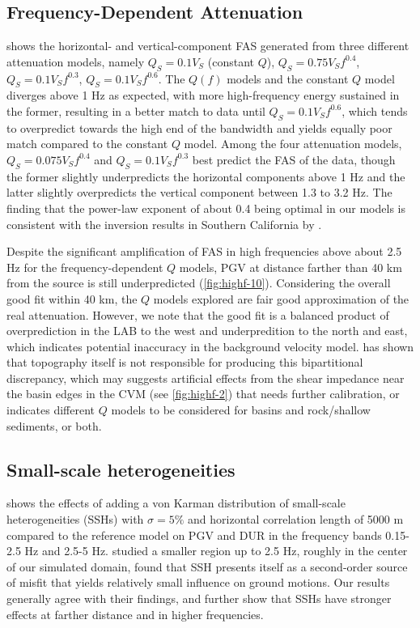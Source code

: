 \subsection{Frequency-Dependent Attenuation}\label{highf:qf}
 shows the horizontal- and vertical-component FAS generated from three different attenuation models, namely $Q_S=0.1V_S$ (constant $Q$), $Q_S=0.75V_Sf^{0.4}$, $Q_S=0.1V_Sf^{0.3}$, $Q_S=0.1V_Sf^{0.6}$. The $Q(f)$ models and the constant $Q$ model diverges above 1 Hz as expected, with more high-frequency energy sustained in the former, resulting in a better match to data until $Q_S=0.1V_Sf^{0.6}$, which tends to overpredict towards the high end of the bandwidth and yields equally poor match compared to the constant $Q$ model. Among the four attenuation models, $Q_S=0.075V_Sf^{0.4}$ and $Q_S=0.1V_Sf^{0.3}$ best predict the FAS of the data, though the former slightly underpredicts the horizontal components above 1 Hz and the latter slightly overpredicts the vertical component between 1.3 to 3.2 Hz. The finding that the power-law exponent of about 0.4 being optimal in our models is consistent with the inversion results in Southern California by \citet{linFrequencyDependentAttenuationWaves2018}.


Despite the significant amplification of FAS in high frequencies above about 2.5 Hz for the frequency-dependent $Q$ models, PGV at distance farther than 40 km from the source is still underpredicted (\cref{fig:highf-10}). Considering the overall good fit within 40 km, the $Q$ models explored are fair good approximation of the real attenuation. However, we note that the good fit is a balanced product of overprediction in the LAB to the west and underpredition to the north and east, which indicates potential inaccuracy in the background velocity model.  has shown that topography itself is not responsible for producing this bipartitional discrepancy, which may suggests artificial effects from the shear impedance near the basin edges in the CVM (see \cref{fig:highf-2}) that needs further calibration, or indicates different $Q$ models to be considered for basins and rock/shallow sediments, or both.

\subsection{Small-scale heterogeneities}
 shows the effects of adding a von Karman distribution of small-scale heterogeneities (SSHs) with $\sigma = 5\%$ and horizontal correlation length of 5000 m compared to the reference model on PGV and DUR in the frequency bands 0.15-2.5 Hz and 2.5-5 Hz. \citet{savranGroundMotionSimulation2019} studied a smaller region up to 2.5 Hz, roughly in the center of our simulated domain, found that SSH presents itself as a second-order source of misfit that yields relatively small influence on ground motions. Our results generally agree with their findings, and further show that SSHs have stronger effects at farther distance and in higher frequencies.

